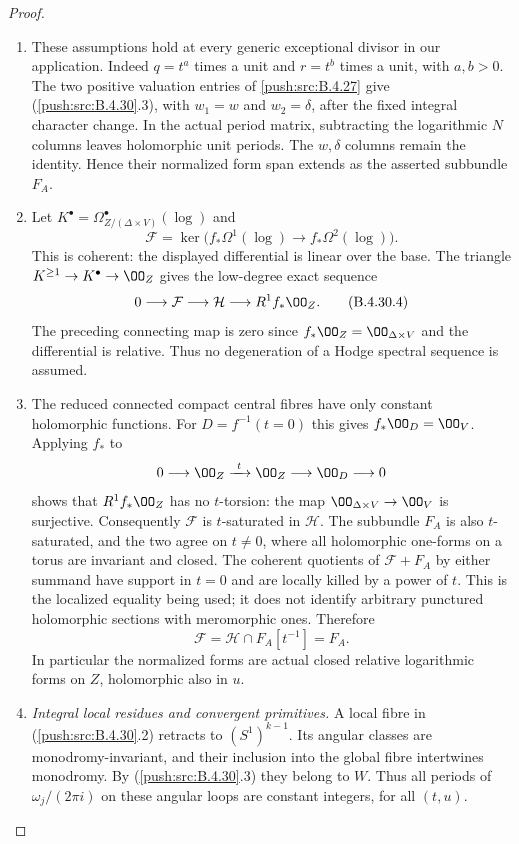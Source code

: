 \begin{proof}
\begin{enumerate}[label=\arabic*.,leftmargin=*]
\item These assumptions hold at every generic
exceptional divisor in our application. Indeed
$q=t^a$ times a unit and $r=t^b$ times a unit,
with $a,b>0$. The two positive valuation entries
of \ref{push:src:B.4.27} give (\ref{push:src:B.4.30}.3), with $w_1=w$ and
$w_2=\delta$, after the fixed integral character
change. In the actual period matrix, subtracting
the logarithmic $N$ columns leaves holomorphic
unit periods. The $w,\delta$ columns remain
the identity. Hence their normalized form span
extends as the asserted subbundle $F_A$.

\item Let $K^\bullet=\Omega^\bullet_{Z/(\Delta\times V)}
(\log)$ and
\[
 \mathcal F=\ker\bigl(f_*\Omega^1(\log)
                   \longrightarrow f_*\Omega^2(\log)\bigr).
\]
This is coherent: the displayed differential
is linear over the base. The triangle
$K^{\ge1}\to K^\bullet\to\OO_Z$ gives the
low-degree exact sequence
\[
 0\longrightarrow\mathcal F
 \longrightarrow\mathcal H
 \longrightarrow R^1f_*\OO_Z.
 \tag{B.4.30.4}
\]
The preceding connecting map is zero since
$f_*\OO_Z=\OO_{\Delta\times V}$ and the
differential is relative. Thus no degeneration
of a Hodge spectral sequence is assumed.

\item The reduced connected compact central fibres
have only constant holomorphic functions.
For $D=f^{-1}(t=0)$ this gives
$f_*\OO_D=\OO_V$. Applying $f_*$ to
\[
 0\longrightarrow\OO_Z\xrightarrow{\ t\ }
 \OO_Z\longrightarrow\OO_D\longrightarrow0
\]
shows that $R^1f_*\OO_Z$ has no $t$-torsion:
the map $\OO_{\Delta\times V}\to\OO_V$ is
surjective. Consequently $\mathcal F$ is
$t$-saturated in $\mathcal H$. The subbundle
$F_A$ is also $t$-saturated, and the two agree
on $t\ne0$, where all holomorphic one-forms
on a torus are invariant and closed. The
coherent quotients of $\mathcal F+F_A$ by
either summand have support in $t=0$ and
are locally killed by a power of $t$. This
is the localized equality being used; it
does not identify arbitrary punctured
holomorphic sections with meromorphic ones.
Therefore
\[
 \mathcal F=\mathcal H\cap F_A[t^{-1}]=F_A.
 \tag{B.4.30.5}
\]
In particular the normalized forms are actual
closed relative logarithmic forms on $Z$,
holomorphic also in $u$.

\item \emph{Integral local residues and convergent primitives.}
A local fibre in (\ref{push:src:B.4.30}.2) retracts to
$(S^1)^{k-1}$. Its angular classes are
monodromy-invariant, and their inclusion into
the global fibre intertwines monodromy. By
(\ref{push:src:B.4.30}.3) they belong to $W$. Thus all periods
of $\omega_j/(2\pi i)$ on these angular loops
are constant integers, for all $(t,u)$.


\end{enumerate}
\end{proof}
